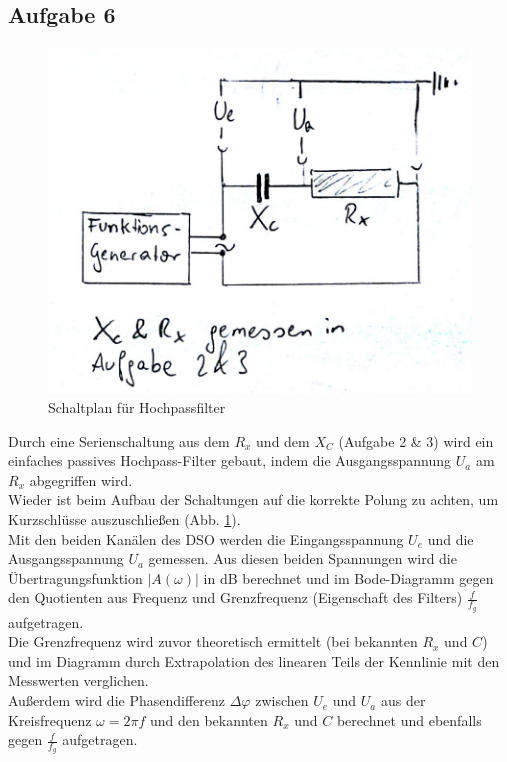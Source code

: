 \documentclass[12pt,a4paper]{article}
\begin{document}
\begin{multicols}{2}
\subsection{Aufgabe 6}

\begin{figure}[H]
	\centering
	\includegraphics[scale=0.6]{./figure/Schaltplan_Aufgabe6.png}
	\caption{Schaltplan für Hochpassfilter}
	\label{fig:plan_hochpass}
\end{figure}

Durch eine Serienschaltung aus dem $R_x$ und dem $X_C$ (Aufgabe 2 \& 3) wird ein einfaches passives Hochpass-Filter gebaut, indem die Ausgangsspannung $U_a$ am $R_x$ abgegriffen wird.\\
Wieder ist beim Aufbau der Schaltungen auf die korrekte Polung zu achten, um Kurzschlüsse auszuschließen (Abb. \ref{fig:plan_hochpass}).\\
Mit den beiden Kanälen des DSO werden die Eingangsspannung $U_e$ und die Ausgangsspannung $U_a$ gemessen. Aus diesen beiden Spannungen wird die Übertragungsfunktion $|A(\omega)|$ in dB berechnet und im Bode-Diagramm gegen den Quotienten aus Frequenz und Grenzfrequenz (Eigenschaft des Filters) $\frac{f}{f_g}$ aufgetragen.\\
Die Grenzfrequenz wird zuvor theoretisch ermittelt (bei bekannten $R_x$ und $C$) und im Diagramm durch Extrapolation des linearen Teils der Kennlinie mit den Messwerten verglichen.\\
Außerdem wird die Phasendifferenz $\Delta \varphi$ zwischen $U_e$ und $U_a$ aus der Kreisfrequenz $\omega = 2 \pi f$ und den bekannten $R_x$ und $C$ berechnet und ebenfalls gegen 
$\frac{f}{f_g}$ aufgetragen.



\end{multicols}
\end{document}
